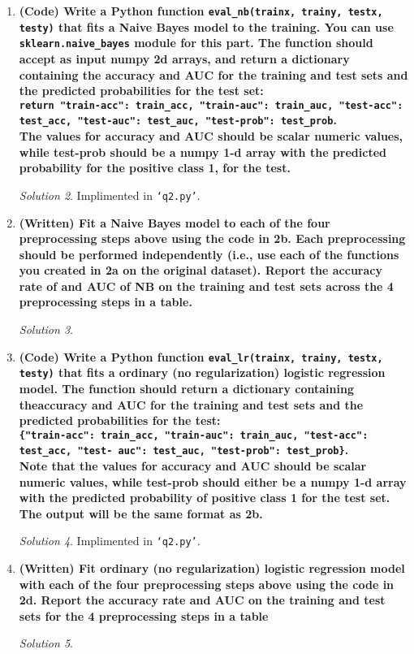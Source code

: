 \documentclass[a4paper,12pt]{article}
\theoremstyle{definition}
\theoremstyle{remark}
\newtheorem*{solution}{Solution}
\begin{document}
\begin{enumerate}
\begin{enumerate}
			\begin{solution}
				Implimented in \texttt{`q2.py'}.
			\end{solution}
			\item {\bf  (Code) Write a Python function \texttt{eval\_nb(trainx, trainy, testx, testy)} that fits a Naive Bayes model to the training. You can use \texttt{sklearn.naive\_bayes} module for this part. The function should accept as input numpy 2d arrays, and return a dictionary containing the accuracy and AUC for the training and test sets and the predicted probabilities for the test set: \\
				\texttt{return {"train-acc":
					train\_acc, "train-auc": train\_auc, "test-acc": test\_acc, "test-auc":
					test\_auc, "test-prob": test\_prob}}. \\
				The values for accuracy and AUC should be scalar
				numeric values, while test-prob should be a numpy 1-d array with the predicted probability for the positive class 1, for the test.}
			\begin{solution}
					Implimented in \texttt{`q2.py'}.
			\end{solution}
			\item {\bf (Written) Fit a Naive Bayes model to each of the four preprocessing steps above using the code in 2b. Each preprocessing should be performed independently (i.e., use each of the functions you created in 2a on the original dataset). Report the accuracy rate of and AUC of NB on the training and test sets across the 4 preprocessing steps in a table.}	
			\begin{solution}
				
			\end{solution}
			\item {\bf(Code) Write a Python function \texttt{eval\_lr(trainx, trainy, testx, testy)} that fits a ordinary (no regularization) logistic regression model. The function should return a dictionary containing theaccuracy and AUC for the training and test sets and the predicted probabilities for the test: \\
				
				\texttt{\{"train-acc": train\_acc, "train-auc": train\_auc, "test-acc": test\_acc, "test-
					auc": test\_auc, "test-prob": test\_prob\}}.\\
				 Note that the values for accuracy and AUC should be scalar numeric values, while test-prob should either be a numpy 1-d array with the predicted probability of positive class 1 for the test set. The output will be the same format as 2b.}
			\begin{solution}
					Implimented in \texttt{`q2.py'}.
			\end{solution}
			\item {\bf(Written) Fit ordinary (no regularization) logistic regression model with each of the four preprocessing steps above using the code in 2d. Report the accuracy rate and AUC on the training and test sets for the 4 preprocessing steps in a table}
			\begin{solution}
				

\end{solution}
\end{enumerate}
\end{enumerate}
\end{document}
